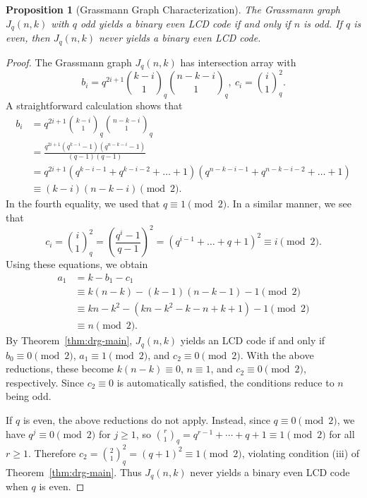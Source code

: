 \documentclass[10pt,a4paper]{amsart}
\newtheorem{proposition}{Proposition}
\begin{document}
\begin{proposition}[Grassmann Graph Characterization]
The Grassmann graph $J_q(n,k)$ with $q$ odd yields a binary even LCD code if and only if $n$ is odd. If $q$ is even, then $J_q(n,k)$ never yields a binary even LCD code.
\end{proposition}

\begin{proof}
The Grassmann graph $J_q(n,k)$ has intersection array with
$$
b_i = q^{2i+1}\binom{k-i}{1}_q \binom{n-k-i}{1}_q,\ c_i = \binom{i}{1}_q^2.
$$
A straightforward calculation shows that
\begin{align*}
b_i
&= q^{2i+1} \binom{k-i}{1}_q \binom{n-k-i}{1}_q\\
&= \frac{q^{2i+1}(q^{k-i}-1)(q^{n-k-i}-1)}{(q-1)(q-1)}\\
&= q^{2i+1} (q^{k-i-1}+q^{k-i-2}+\dots+1)(q^{n-k-i-1}+q^{n-k-i-2}+\dots+1)\\
&\equiv (k-i)(n-k-i) \pmod 2.
\end{align*}
In the fourth equality, we used that $q \equiv 1 \pmod 2$.
In a similar manner, we see that
$$
c_i
= \binom{i}{1}_q^2
= (\frac{q^i-1}{q-1})^2
= (q^{i-1}+ \dots + q+1)^2
\equiv i \pmod 2.
$$
Using these equations, we obtain
\begin{align*}   
a_1
&= k - b_1 - c_1\\
&\equiv k(n-k) - (k-1)(n-k-1) - 1 \pmod 2\\
&\equiv kn - k^2 - (kn - k^2 - k - n + k + 1) - 1 \pmod 2\\
&\equiv n \pmod 2.
\end{align*}
By Theorem~\ref{thm:drg-main}, $J_q(n,k)$ yields an LCD code if and only if $b_0 \equiv 0 \pmod 2$, $a_1 \equiv 1 \pmod 2$, and $c_2 \equiv 0 \pmod 2$. With the above reductions, these become $k(n-k) \equiv 0$, $n \equiv 1$, and $c_2 \equiv 0 \pmod 2$, respectively. Since $c_2 \equiv 0$ is automatically satisfied, the conditions reduce to $n$ being odd.

If $q$ is even, the above reductions do not apply.
Instead, since $q \equiv 0 \pmod 2$, we have $q^j \equiv 0 \pmod 2$ for $j \geq 1$, so $\binom{r}{1}_q = q^{r-1}+\cdots+q+1 \equiv 1 \pmod 2$ for all $r \geq 1$. Therefore $c_2 = \binom{2}{1}_q^2 = (q+1)^2 \equiv 1 \pmod 2$, violating condition (iii) of Theorem~\ref{thm:drg-main}. Thus $J_q(n,k)$ never yields a binary even LCD code when $q$ is even.
\end{proof}
\end{document}
